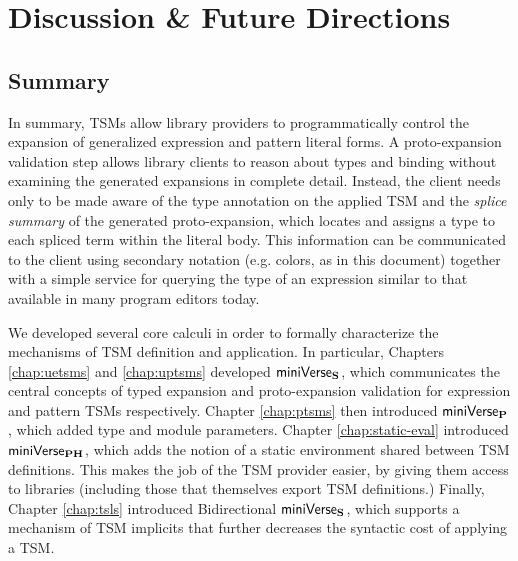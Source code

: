 \chapter{Discussion \& Future Directions}\label{chap:conclusion}


\section{Summary}

In summary, TSMs allow library providers to programmatically control the expansion of generalized expression and pattern literal forms. A proto-expansion validation step allows library clients to reason about types and binding without examining the generated expansions in complete detail. Instead, the client needs only to be made aware of the type annotation on the applied TSM and the \emph{splice summary} of the generated proto-expansion, which locates and assigns a type to each spliced term within the literal body. This information can be communicated to the client using secondary notation (e.g. colors, as in this document) together with a simple service for querying the type of an expression similar to that available in many program editors today.

We developed several core calculi in order to formally characterize the mechanisms of TSM definition and application. In particular, Chapters \ref{chap:uetsms} and \ref{chap:uptsms} developed $\mathsf{miniVerse}_\textbf{S}$, which communicates the central concepts of typed expansion and proto-expansion validation for expression and pattern TSMs respectively. Chapter \ref{chap:ptsms} then introduced $\mathsf{miniVerse}_\textbf{P}$, which added type and module parameters. Chapter \ref{chap:static-eval} introduced $\mathsf{miniVerse}_\textbf{PH}$, which adds the notion of a static environment shared between TSM definitions. This makes the job of the TSM provider easier, by giving them access to libraries (including those that themselves export TSM definitions.) Finally, Chapter \ref{chap:tsls} introduced Bidirectional $\mathsf{miniVerse}_\textbf{S}$, which supports a mechanism of TSM implicits that further decreases the syntactic cost of applying a TSM.


